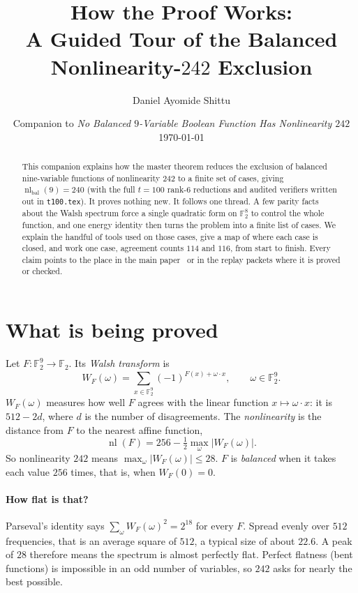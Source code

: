 \documentclass[11pt]{article}
\title{How the Proof Works:\\
A Guided Tour of the Balanced Nonlinearity-$242$ Exclusion}
\author{Daniel Ayomide Shittu}
\date{Companion to \emph{No Balanced $9$-Variable Boolean Function Has Nonlinearity $242$}\\[2pt] \today}
\theoremstyle{definition}
\theoremstyle{remark}
\newcommand{\F}{\mathbb{F}}
\newcommand{\nl}{\operatorname{nl}}
\newcommand{\code}[1]{\texttt{#1}}
\DeclareRobustCommand{\_}{\textunderscore\allowbreak}
\newcommand{\main}{\cite{Main}}
\begin{document}
\maketitle

\begin{abstract}
This companion explains how the master theorem reduces the exclusion of balanced nine-variable functions of nonlinearity $242$ to a finite set of cases, giving $\nl_{\mathrm{bal}}(9)=240$ (with the full $t=100$ rank-$6$ reductions and audited verifiers written out in \code{t100.tex}). It proves nothing new. It follows one thread. A few parity facts about the Walsh spectrum force a single quadratic form on $\F_2^8$ to control the whole function, and one energy identity then turns the problem into a finite list of cases. We explain the handful of tools used on those cases, give a map of where each case is closed, and work one case, agreement counts $114$ and $116$, from start to finish. Every claim points to the place in the main paper~\main{} or in the replay packets where it is proved or checked.
\end{abstract}

\tableofcontents

\section{What is being proved}

Let $F:\F_2^9\to\F_2$. Its \emph{Walsh transform} is
\[
  W_F(\omega)=\sum_{x\in\F_2^9}(-1)^{F(x)+\omega\cdot x},\qquad \omega\in\F_2^9 .
\]
$W_F(\omega)$ measures how well $F$ agrees with the linear function $x\mapsto\omega\cdot x$: it is $512-2d$, where $d$ is the number of disagreements. The \emph{nonlinearity} is the distance from $F$ to the nearest affine function,
\[
  \nl(F)=256-\tfrac12\max_\omega|W_F(\omega)| .
\]
So nonlinearity $242$ means $\max_\omega |W_F(\omega)|\le 28$. $F$ is \emph{balanced} when it takes each value $256$ times, that is, when $W_F(0)=0$.

\paragraph{How flat is that?} Parseval's identity says $\sum_\omega W_F(\omega)^2=2^{18}$ for every $F$. Spread evenly over $512$ frequencies, that is an average square of $512$, a typical size of about $22.6$. A peak of $28$ therefore means the spectrum is almost perfectly flat. Perfect flatness (bent functions) is impossible in an odd number of variables, so $242$ asks for nearly the best possible.
\end{document}
